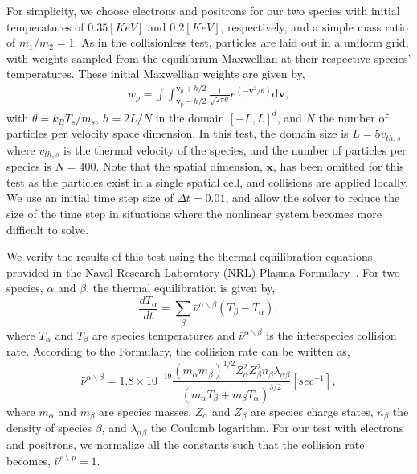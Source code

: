 \documentclass[preprint,12pt]{elsarticle}
\theoremstyle{definition}
\begin{document}
For simplicity, we choose electrons and positrons for our two species with initial temperatures of $0.35\left[KeV\right]$ and $0.2\left[KeV\right]$, respectively, and a simple mass ratio of $m_1/m_2=1$. As in the collisionless test, particles are laid out in a uniform grid, with weights sampled from the equilibrium Maxwellian at their respective species' temperatures. These initial Maxwellian weights are given by,
\begin{align}
    w_p = \int\int_{\boldsymbol{v}_p - h/2}^{\boldsymbol{v}_p + h/2} \frac{1}{\sqrt{2\pi\theta}} e^{(-\boldsymbol{v}^2/\theta)} \mathrm{d} \boldsymbol{v},
\end{align}
with $\theta = k_BT_s/m_s$, $h = 2L/N$ in the domain $[-L,L]^d$, and $N$ the number of particles per velocity space dimension. In this test, the domain size is $L=5 v_{th,s}$ where $v_{th,s}$ is the thermal velocity of the species, and the number of particles per species is $N=400$. Note that the spatial dimension, $\boldsymbol{x}$, has been omitted for this test as the particles exist in a single spatial cell, and collisions are applied locally. We use an initial time step size of $\Delta t = 0.01$, and allow the solver to reduce the size of the time step in situations where the nonlinear system becomes more difficult to solve.

We verify the results of this test using the thermal equilibration equations provided in the Naval Research Laboratory (NRL) Plasma Formulary~\cite{nrlformulary2023}. For two species, $\alpha$ and $\beta$, the thermal equilibration is given by,
\begin{equation}
    \frac{d T_{\alpha}}{dt} = \sum_{\beta} \bar{\nu}^{\alpha \backslash \beta} \left(T_{\beta} - T_{\alpha}\right),
\end{equation}
where $T_{\alpha}$ and $T_{\beta}$ are species temperatures and $\bar{\nu}^{\alpha \backslash \beta}$ is the interspecies collision rate. According to the Formulary, the collision rate can be written as,
\begin{equation}
    \bar{\nu}^{\alpha \backslash \beta} = 1.8\times 10^{-19} \frac{\left(m_{\alpha} m_{\beta}\right)^{1/2} Z_{\alpha}^{2} Z_{\beta}^{2} n_{\beta} \lambda_{\alpha \beta}}{\left(m_{\alpha} T_{\beta}+m_{\beta} T_{\alpha}\right)^{3/2}} \left[sec^{-1}\right],
\end{equation}
where
$m_{\alpha}$ and $m_{\beta}$ are species masses, $Z_{\alpha}$ and $Z_{\beta}$ are species charge states, $n_{\beta}$ the density of species $\beta$, and $\lambda_{\alpha \beta}$ the Coulomb logarithm. For our test with electrons and positrons, we normalize all the constants such that the collision rate becomes, $\bar{\nu}^{e \backslash p}=1$.
\end{document}
